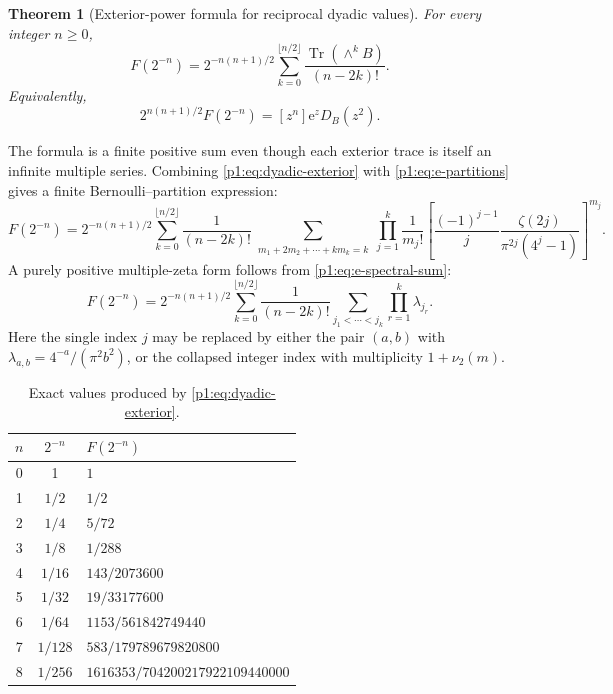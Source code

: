 \documentclass[11pt,oneside]{article}
\newtheorem{theorem}{Theorem}[section]
\theoremstyle{definition}
\newcommand{\e}{\mathrm e}
\newcommand{\Tr}{\operatorname{Tr}}
\newcommand{\vtwo}{\nu_2}
\begin{document}
\begin{theorem}[Exterior-power formula for reciprocal dyadic values]
\label{p1:thm:dyadic-exterior}
For every integer \(n\ge0\),
\begin{equation}
 \boxed{\quad
 F(2^{-n})=2^{-n(n+1)/2}
 \sum_{k=0}^{\lfloor n/2\rfloor}
 \frac{\Tr(\wedge^kB)}{(n-2k)!}.
 \quad}
 \label{p1:eq:dyadic-exterior}
\end{equation}
Equivalently,
\begin{equation}
 2^{n(n+1)/2}F(2^{-n})
 =[z^n]\e^zD_B(z^2).
 \label{p1:eq:dyadic-coefficient-det}
\end{equation}
\end{theorem}

The formula is a finite positive sum even though each exterior trace is itself an
infinite multiple series.  Combining \eqref{p1:eq:dyadic-exterior} with
\eqref{p1:eq:e-partitions} gives a finite Bernoulli--partition expression:
\begin{equation}
 F(2^{-n})=2^{-n(n+1)/2}
 \sum_{k=0}^{\lfloor n/2\rfloor}\frac1{(n-2k)!}
 \sum_{\substack{m_1+2m_2+\cdots+km_k=k}}
 \prod_{j=1}^{k}
 \frac1{m_j!}
 \left[\frac{(-1)^{j-1}}j
 \frac{\zeta(2j)}{\pi^{2j}(4^j-1)}\right]^{m_j}.
 \label{p1:eq:dyadic-Bernoulli-partition}
\end{equation}
A purely positive multiple-zeta form follows from \eqref{p1:eq:e-spectral-sum}:
\begin{equation}
 F(2^{-n})=2^{-n(n+1)/2}
 \sum_{k=0}^{\lfloor n/2\rfloor}\frac1{(n-2k)!}
 \sum_{j_1<\cdots<j_k}\prod_{r=1}^{k}\lambda_{j_r}.
 \label{p1:eq:dyadic-positive-multiple}
\end{equation}
Here the single index \(j\) may be replaced by either the pair \((a,b)\) with
\(\lambda_{a,b}=4^{-a}/(\pi^2b^2)\), or the collapsed integer index with
multiplicity \(1+\vtwo(m)\).

\begin{table}[H]
\centering
\caption{Exact values produced by \eqref{p1:eq:dyadic-exterior}.}
\label{p1:tab:dyadic-values}
\begin{tabular}{ccl}
\toprule
\(n\)&\(2^{-n}\)&\(F(2^{-n})\)\\
\midrule
0&1&\(1\)\\
1&\(1/2\)&\(1/2\)\\
2&\(1/4\)&\(5/72\)\\
3&\(1/8\)&\(1/288\)\\
4&\(1/16\)&\(143/2073600\)\\
5&\(1/32\)&\(19/33177600\)\\
6&\(1/64\)&\(1153/561842749440\)\\
7&\(1/128\)&\(583/179789679820800\)\\
8&\(1/256\)&\(1616353/704200217922109440000\)\\
\bottomrule
\end{tabular}
\end{table}
\end{document}
